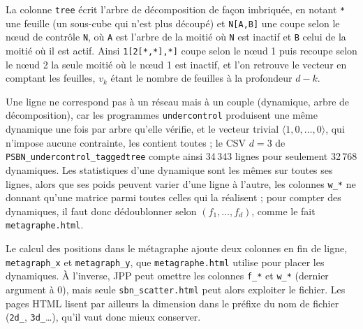La colonne \texttt{tree} écrit l'arbre de décomposition de façon imbriquée, en notant \texttt{*} une feuille (un sous-cube qui n'est plus découpé) et \texttt{N[A,B]} une coupe selon le nœud de contrôle \texttt{N}, où \texttt{A} est l'arbre de la moitié où \texttt{N} est inactif et \texttt{B} celui de la moitié où il est actif.
Ainsi \texttt{1[2[*,*],*]} coupe selon le nœud 1 puis recoupe selon le nœud 2 la seule moitié où le nœud 1 est inactif, et l'on retrouve le vecteur en comptant les feuilles, $v_k$ étant le nombre de feuilles à la profondeur $d-k$.

Une ligne ne correspond pas à un réseau mais à un couple (dynamique, arbre de décomposition), car les programmes \texttt{undercontrol} produisent une même dynamique une fois par arbre qu'elle vérifie, et le vecteur trivial $\langle 1,0,\dots,0\rangle$, qui n'impose aucune contrainte, les contient toutes ; le CSV $d=3$ de \texttt{PSBN\_undercontrol\_taggedtree} compte ainsi 34\,343 lignes pour seulement 32\,768 dynamiques.
Les statistiques d'une dynamique sont les mêmes sur toutes ses lignes, alors que ses poids peuvent varier d'une ligne à l'autre, les colonnes \texttt{w\_*} ne donnant qu'une matrice parmi toutes celles qui la réalisent ; pour compter des dynamiques, il faut donc dédoublonner selon $(f_1,\dots,f_d)$, comme le fait \texttt{metagraphe.html}.

Le calcul des positions dans le métagraphe ajoute deux colonnes en fin de ligne, \texttt{metagraph\_x} et \texttt{metagraph\_y}, que \texttt{metagraphe.html} utilise pour placer les dynamiques.
À l'inverse, JPP peut omettre les colonnes \texttt{f\_*} et \texttt{w\_*} (dernier argument à 0), mais seule \texttt{sbn\_scatter.html} peut alors exploiter le fichier.
Les pages HTML lisent par ailleurs la dimension dans le préfixe du nom de fichier (\texttt{2d\_}, \texttt{3d\_}\dots), qu'il vaut donc mieux conserver.
